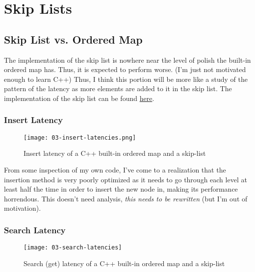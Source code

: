\section{Skip Lists}

\subsection{Skip List vs. Ordered Map}

\begin{tcolorbox}[title=Disclaimer]
	The implementation of the skip list is nowhere near the level of polish the built-in ordered map has. Thus, it is expected to perform worse. (I'm just not motivated enough to learn C++) Thus, I think this portion will be more like a study of the pattern of the latency as more elements are added to it in the skip list. The implementation of the skip list can be found \href{https://github.com/nngerncham/cs315_apal/tree/main/assignments/asn01/03-skip-list}{here}.
\end{tcolorbox}


\subsubsection{Insert Latency}
\begin{figure}[H]
	\begin{center}
		\texttt{[image: 03-insert-latencies.png]}
		\caption{Insert latency of a C++ built-in ordered map and a skip-list}
		\label{fig:03-insert-latency}
	\end{center}
\end{figure}

From some inspection of my own code, I've come to a realization that the insertion method is very poorly optimized as it needs to go through each level at least half the time in order to insert the new node in, making its performance horrendous. This doesn't need analysis, \textit{this needs to be rewritten} (but I'm out of motivation).

\begingroup

\subsubsection{Search Latency}
\begin{figure}[H]
	\begin{center}
		\texttt{[image: 03-search-latencies]}
		\caption{Search (get) latency of a C++ built-in ordered map and a skip-list}
		\label{fig:03-search-latency}
	\end{center}
\end{figure}

